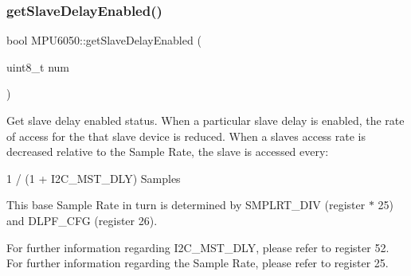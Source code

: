 \begin{DoxyCode}{0}

\end{DoxyCode}
\mbox{\label{classMPU6050_ae84fd795630f9ab5e8d6b19a616a11ce}} 
\subsubsection{\texorpdfstring{getSlaveDelayEnabled()}{getSlaveDelayEnabled()}}
{\footnotesize\ttfamily bool M\+P\+U6050\+::get\+Slave\+Delay\+Enabled (\begin{DoxyParamCaption}\item[{uint8\+\_\+t}]{num }\end{DoxyParamCaption})}

Get slave delay enabled status. When a particular slave delay is enabled, the rate of access for the that slave device is reduced. When a slave\textquotesingle{}s access rate is decreased relative to the Sample Rate, the slave is accessed every\+: \begin{DoxyVerb}1 / (1 + I2C_MST_DLY) Samples
\end{DoxyVerb}


This base Sample Rate in turn is determined by S\+M\+P\+L\+R\+T\+\_\+\+D\+IV (register $\ast$ 25) and D\+L\+P\+F\+\_\+\+C\+FG (register 26).

For further information regarding I2\+C\+\_\+\+M\+S\+T\+\_\+\+D\+LY, please refer to register 52. For further information regarding the Sample Rate, please refer to register 25.


